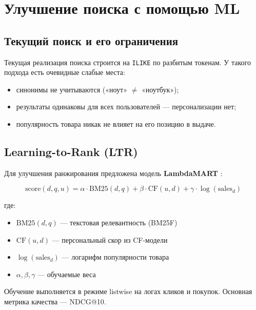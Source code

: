 \documentclass[14pt,a4paper]{extreport}
\begin{document}
\section{Улучшение поиска с помощью ML}

\subsection{Текущий поиск и его ограничения}

Текущая реализация поиска строится на \texttt{ILIKE} по разбитым токенам. У такого подхода есть очевидные слабые места:
\begin{itemize}
  \item синонимы не учитываются («ноут» $\neq$ «ноутбук»);
  \item результаты одинаковы для всех пользователей — персонализации нет;
  \item популярность товара никак не влияет на его позицию в выдаче.
\end{itemize}

\subsection{Learning-to-Rank (LTR)}

Для улучшения ранжирования предложена модель \textbf{LambdaMART} \cite{burges2010}:

\begin{equation}
  \text{score}(d, q, u) = \alpha \cdot \text{BM25}(d, q) + \beta \cdot \text{CF}(u, d) + \gamma \cdot \log(\text{sales}_{d})
\end{equation}

где:
\begin{itemize}
  \item $\text{BM25}(d, q)$ --- текстовая релевантность (BM25F)
  \item $\text{CF}(u, d)$ --- персональный скор из CF-модели
  \item $\log(\text{sales}_d)$ --- логарифм популярности товара
  \item $\alpha, \beta, \gamma$ --- обучаемые веса
\end{itemize}

Обучение выполняется в режиме listwise на логах кликов и покупок. Основная метрика качества --- NDCG@10.

\begin{table}[h!]
\centering
\caption{Сравнение методов поиска}
\end{table}
\end{document}
